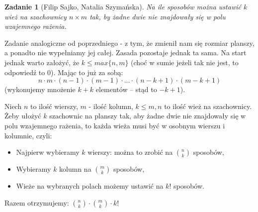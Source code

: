 \documentclass{mwart}
\newtheorem{zad}{Zadanie}[section]
\begin{document}
\begin{zad}[Filip Sajko, Natalia Szymańska]
    Na ile sposobów można ustawić $k$ wież na szachownicy $n \times m$
    tak, by żadne dwie nie znajdowały się w polu wzajemnego rażenia.
\end{zad}
\begin{mdframed}
    Zadanie analogiczne od poprzedniego - z tym, że zmienił nam się
    rozmiar planszy, a ponadto nie wypełniamy jej całej. Zasada
    pozostaje jednak ta sama. Na start jednak warto założyć, że
    $k \leq max\{n, m\}$ (choć w sumie jeżeli tak nie jest, to
    odpowiedź to 0). Mając to już za sobą:
    \[n \cdot m \cdot (n-1) \cdot (m-1) \cdot ... \cdot (n - k +1) \cdot (m -k +1)\]
    (wykonujemy mnożenie $k + k$ elementów -- stąd to $-k + 1$).
\end{mdframed}
\begin{mdframed}
    Niech $n$ to ilość wierszy, $m$ - ilość kolumn,
\begin{math}
    k \leq m, n
\end{math}
to ilość wież na szachownicy. Żeby ułożyć $k$ szachownic na planszy tak, aby żadne dwie nie znajdowały się w polu wzajemnego rażenia, to każda wieża musi być w osobnym wierszu i kolumnie, czyli:
\begin{itemize}
    \item Najpierw wybieramy $k$ wierszy: można to zrobić na ${n}\choose{k}$ sposobów,
    \item Wybieramy $k$ kolumn na ${m}\choose{k}$ sposobów,
    \item Wieże na wybranych polach możemy ustawić na $k!$ sposobów.
\end{itemize}
Razem otrzymujemy: ${{n}\choose{k}}\cdot{{m}\choose{k}}\cdot{k!}$
\end{mdframed}
\end{document}

